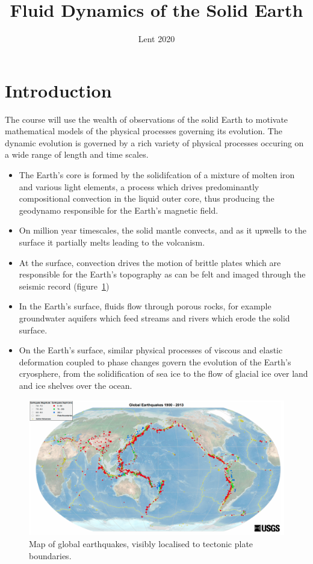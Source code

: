 \documentclass{jknotes}
\begin{document}
\title{Fluid Dynamics of the Solid Earth}
\date{Lent 2020}

\maketitle
\suggestionsspiel
\tableofcontents

\section{Introduction}
The course will use the wealth of observations of the solid Earth to motivate
mathematical models of the physical processes governing its evolution. The
dynamic evolution is governed by a rich variety of physical processes occuring
on a wide range of length and time scales. 

\begin{itemize}
	\item The Earth's core is formed by the solidifcation of a mixture of
		molten iron and various light elements, a process which drives
		predominantly compositional convection in the liquid outer core, thus
		producing the geodynamo responsible for the Earth's magnetic field. 
	\item On million year timescales, the solid mantle convects, and as it
		upwells to the surface it partially melts leading to the volcanism. 
	\item At the surface, convection drives the motion of brittle plates which
		are responsible for the Earth's topography as can be felt and imaged
		through the seismic record (figure~\ref{fig:seismology})
	\item In the Earth's surface, fluids flow through porous rocks, for
		example groundwater aquifers which feed streams and rivers which erode
		the solid surface.
	\item On the Earth's surface, similar physical processes of viscous and
		elastic deformation coupled to phase changes govern the evolution of
		the Earth's cryosphere, from the solidification of sea ice to the flow
		of glacial ice over land and ice shelves over the ocean.
\end{itemize}
\begin{figure}
	\centering
	\includegraphics[width=\textwidth]{earthquakes.png}
	\caption{Map of global earthquakes, visibly localised to tectonic plate
	boundaries.}
	\label{fig:seismology}
\end{figure}
\end{document}
